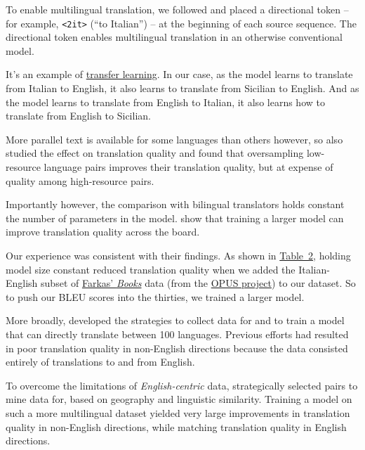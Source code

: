 \documentclass[10pt,letterpaper]{article}
\begin{document}
To enable multilingual translation, we followed \citet{johnson2017zeroshot} and placed a directional
token -- for example, \texttt{<2it>} (``to Italian'') -- at the beginning of each source sequence.
The directional token enables multilingual translation in an otherwise conventional model.

It's an example of \href{https://en.wikipedia.org/wiki/Transfer_learning}{transfer learning}. 
In our case, as the model learns to translate from Italian to English, it also learns to translate 
from Sicilian to English.  And as the model learns to translate from English to Italian, 
it also learns how to translate from English to Sicilian.
      
More parallel text is available for some languages than others however, so 
\citeauthor{johnson2017zeroshot} also studied the effect on translation quality
and found that oversampling low-resource language pairs improves
their translation quality, but at expense of quality among high-resource pairs.
      
Importantly however, the comparison with bilingual translators holds constant the number of parameters in the model.
\citet{arivazhagan2019massively} show that training a larger model can improve translation quality across the board.

Our experience was consistent with their findings.
As shown in \hyperlink{bleuscores}{Table~2}, %
holding model size constant reduced translation quality when we added 
the Italian-English subset of
\href{https://farkastranslations.com/bilingual_books.php}{Farkas' \textit{Books}} data
(from the \href{https://opus.nlpl.eu/}{OPUS project}) to our dataset.
So to push our BLEU scores into the thirties, we trained a larger model.

More broadly, \citet{fan2020beyond} developed the strategies to collect data for and
to train a model that can directly translate between 100 languages.
Previous efforts had resulted in poor translation quality in
non-English directions because the data consisted entirely of translations to and from English.

To overcome the limitations of \textit{English-centric} data, \citeauthor{fan2020beyond}
strategically selected pairs to mine data for, based on geography and linguistic similarity.
Training a model on such a more multilingual dataset yielded very large improvements in translation
quality in non-English directions, while matching translation quality in English directions.
      
\end{document}

